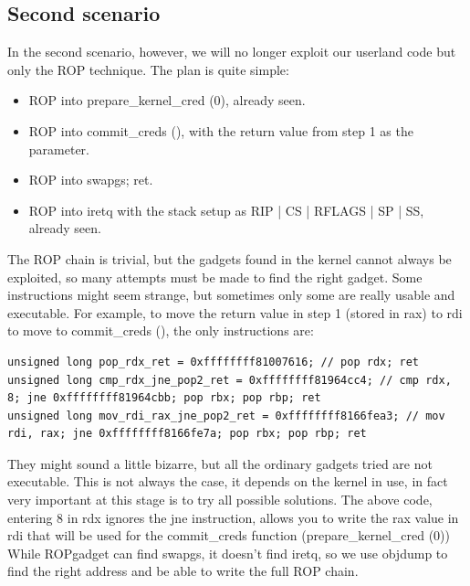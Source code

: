 \documentclass{masterthesis}
\begin{document}
\subsection{Second scenario}
In the second scenario, however, we will no longer exploit our userland code but only the ROP technique.
The plan is quite simple:
\begin{itemize}
\item ROP into prepare_kernel_cred (0), already seen.
\item ROP into commit_creds (), with the return value from step 1 as the parameter.
\item ROP into swapgs; ret.
\item ROP into iretq with the stack setup as RIP | CS | RFLAGS | SP | SS, already seen.
\end{itemize}
The ROP chain is trivial, but the gadgets found in the kernel cannot always be exploited, so many attempts must be made to find the right gadget.
Some instructions might seem strange, but sometimes only some are really usable and executable.
For example, to move the return value in step 1 (stored in rax) to rdi to move to commit_creds (), the only instructions are:
\begin{lstlisting}
unsigned long pop_rdx_ret = 0xffffffff81007616; // pop rdx; ret
unsigned long cmp_rdx_jne_pop2_ret = 0xffffffff81964cc4; // cmp rdx, 8; jne 0xffffffff81964cbb; pop rbx; pop rbp; ret
unsigned long mov_rdi_rax_jne_pop2_ret = 0xffffffff8166fea3; // mov rdi, rax; jne 0xffffffff8166fe7a; pop rbx; pop rbp; ret
\end{lstlisting}
They might sound a little bizarre, but all the ordinary gadgets tried are not executable.
This is not always the case, it depends on the kernel in use, in fact very important at this stage is to try all possible solutions.
The above code, entering 8 in rdx ignores the jne instruction, allows you to write the rax value in rdi that will be used for the commit_creds function (prepare_kernel_cred (0))
While ROPgadget can find swapgs, it doesn't find iretq, so we use objdump to find the right address and be able to write the full ROP chain.
\end{document}
